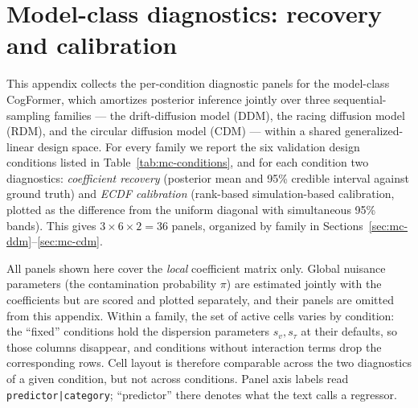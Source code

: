 \renewcommand{\topfraction}{0.92}
\renewcommand{\bottomfraction}{0.7}
\renewcommand{\textfraction}{0.06}
\renewcommand{\floatpagefraction}{0.6}

\section{Model-class diagnostics: recovery and calibration}
\label{app:model-class-figures}

This appendix collects the per-condition diagnostic panels for the model-class
CogFormer, which amortizes posterior inference jointly over three
sequential-sampling families --- the drift-diffusion model (DDM), the racing
diffusion model (RDM), and the circular diffusion model (CDM) --- within a
shared generalized-linear design space. For every family we report the six
validation design conditions listed in Table~\ref{tab:mc-conditions}, and for
each condition two diagnostics: \emph{coefficient recovery} (posterior mean and
95\% credible interval against ground truth) and \emph{ECDF calibration}
(rank-based simulation-based calibration, plotted as the difference from the
uniform diagonal with simultaneous 95\% bands). This gives
$3 \times 6 \times 2 = 36$ panels, organized by family in
Sections~\ref{sec:mc-ddm}--\ref{sec:mc-cdm}.

All panels shown here cover the \emph{local} coefficient matrix only. Global
nuisance parameters (the contamination probability $\pi$) are estimated jointly
with the coefficients but are scored and plotted separately, and their panels
are omitted from this appendix. Within a family, the set of active cells varies
by condition: the ``fixed'' conditions hold the dispersion parameters
$s_v, s_\tau$ at their defaults, so those columns disappear, and conditions
without interaction terms drop the corresponding rows. Cell layout is therefore
comparable across the two diagnostics of a given condition, but not across
conditions. Panel axis labels read \texttt{predictor|category}; ``predictor''
there denotes what the text calls a regressor.


